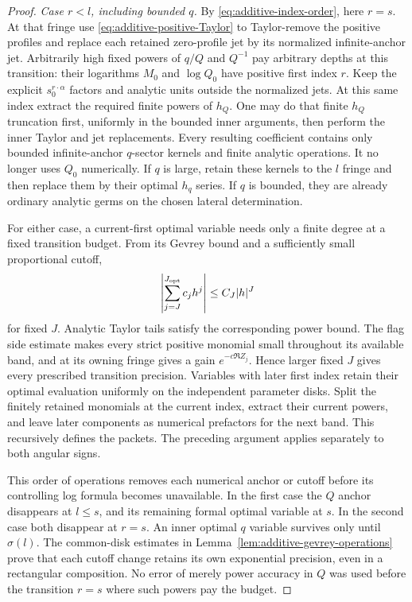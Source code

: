 \begin{proof}
\emph{Case $r<l$, including bounded $q$.}  By
\eqref{eq:additive-index-order}, here $r=s$.  At that fringe use
\eqref{eq:additive-positive-Taylor} to Taylor-remove the positive
profiles and replace each retained zero-profile jet by its normalized
infinite-anchor jet.  Arbitrarily high fixed powers of $q/Q$ and
$Q^{-1}$ pay arbitrary depths at this transition: their logarithms
$M_0$ and $\log Q_0$ have positive first index $r$.  Keep the explicit
$s_0^{r\cdot\alpha}$ factors and analytic units outside the normalized
jets.  At this same index extract the required finite powers of $h_Q$.
One may do that finite $h_Q$ truncation first, uniformly in the bounded
inner arguments, then perform the inner Taylor and jet replacements.
Every resulting coefficient contains only bounded infinite-anchor
$q$-sector kernels and finite analytic operations.  It no longer uses
$Q_0$ numerically.  If $q$ is large, retain these kernels to the $l$
fringe and then replace them by their optimal $h_q$ series.  If $q$
is bounded, they are already ordinary analytic germs on the chosen
lateral determination.

For either case, a current-first optimal variable needs only a finite
degree at a fixed transition budget.  From its Gevrey bound and a
sufficiently small proportional cutoff,
\[
 \left|\sum_{j=J}^{J_{\rm opt}}c_jh^j\right|
          \le C_J|h|^J
\]
for fixed $J$.  Analytic Taylor tails satisfy the corresponding power
bound.  The flag side estimate makes every strict positive monomial
small throughout its available band, and at its owning fringe gives
a gain $e^{-c\Re Z_j}$.  Hence larger fixed $J$ gives every prescribed
transition precision.  Variables with later first index retain their
optimal evaluation uniformly on the independent parameter disks.
Split the finitely retained monomials at the current index, extract
their current powers, and leave later components as numerical
prefactors for the next band.  This recursively defines the packets.
The preceding argument applies separately to both angular signs.

This order of operations removes each numerical anchor or cutoff
before its controlling log formula becomes unavailable.  In the first
case the $Q$ anchor disappears at $l\le s$, and its remaining formal
optimal variable at $s$.  In the second case both disappear at $r=s$.
An inner optimal $q$ variable survives only until $\sigma(l)$.
The common-disk estimates in
Lemma~\ref{lem:additive-gevrey-operations} prove that each cutoff
change retains its own exponential precision, even in a rectangular
composition.  No error of merely power accuracy in $Q$ was used before
the transition $r=s$ where such powers pay the budget.


\end{proof}
